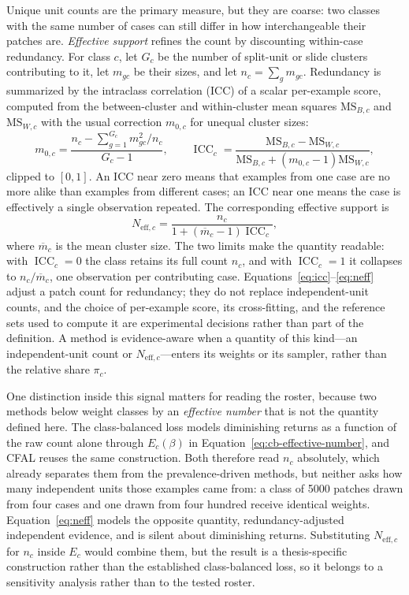 \documentclass[11pt]{article}
\begin{document}
Unique unit counts are the primary measure, but they are coarse: two classes with the same number of cases can still differ in how interchangeable their patches are. \emph{Effective support} refines the count by discounting within-case redundancy. For class $c$, let $G_c$ be the number of split-unit or slide clusters contributing to it, let $m_{gc}$ be their sizes, and let $n_c=\sum_{g}m_{gc}$. Redundancy is summarized by the intraclass correlation (ICC) of a scalar per-example score, computed from the between-cluster and within-cluster mean squares $\mathrm{MS}_{B,c}$ and $\mathrm{MS}_{W,c}$ with the usual correction $m_{0,c}$ for unequal cluster sizes:
\begin{equation}
  m_{0,c}=\frac{n_c-\sum_{g=1}^{G_c}m_{gc}^2/n_c}{G_c-1},
  \qquad
  \operatorname{ICC}_c=
  \frac{\mathrm{MS}_{B,c}-\mathrm{MS}_{W,c}}
  {\mathrm{MS}_{B,c}+(m_{0,c}-1)\mathrm{MS}_{W,c}},
  \label{eq:icc}
\end{equation}
\noindent clipped to $[0,1]$. An ICC near zero means that examples from one case are no more alike than examples from different cases; an ICC near one means the case is effectively a single observation repeated. The corresponding effective support is
\begin{equation}
  N_{\mathrm{eff},c}=\frac{n_c}{1+(\overline m_c-1)\operatorname{ICC}_c},
  \label{eq:neff}
\end{equation}
\noindent where $\overline m_c$ is the mean cluster size. The two limits make the quantity readable: with $\operatorname{ICC}_c=0$ the class retains its full count $n_c$, and with $\operatorname{ICC}_c=1$ it collapses to $n_c/\overline m_c$, one observation per contributing case. Equations~\eqref{eq:icc}--\eqref{eq:neff} adjust a patch count for redundancy; they do not replace independent-unit counts, and the choice of per-example score, its cross-fitting, and the reference sets used to compute it are experimental decisions rather than part of the definition. A method is evidence-aware when a quantity of this kind---an independent-unit count or $N_{\mathrm{eff},c}$---enters its weights or its sampler, rather than the relative share $\pi_c$.

One distinction inside this signal matters for reading the roster, because two methods below weight classes by an \emph{effective number} that is not the quantity defined here. The class-balanced loss models diminishing returns as a function of the raw count alone through $E_c(\beta)$ in Equation~\eqref{eq:cb-effective-number}, and CFAL reuses the same construction. Both therefore read $n_c$ absolutely, which already separates them from the prevalence-driven methods, but neither asks how many independent units those examples came from: a class of \num{5000} patches drawn from four cases and one drawn from four hundred receive identical weights. Equation~\eqref{eq:neff} models the opposite quantity, redundancy-adjusted independent evidence, and is silent about diminishing returns. Substituting $N_{\mathrm{eff},c}$ for $n_c$ inside $E_c$ would combine them, but the result is a thesis-specific construction rather than the established class-balanced loss, so it belongs to a sensitivity analysis rather than to the tested roster.
\end{document}
